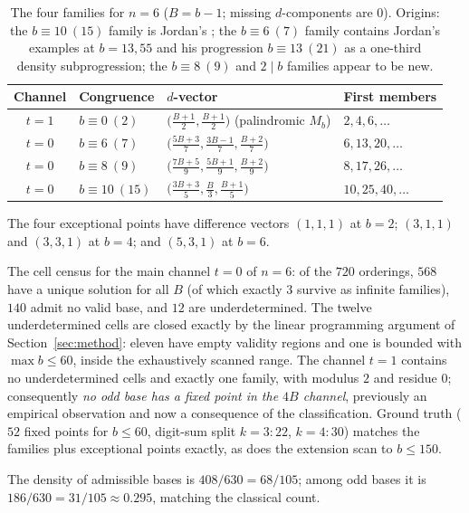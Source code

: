 \documentclass[11pt]{amsart}
\theoremstyle{definition}
\begin{document}
\begin{table}[ht]
\caption{The four families for $n=6$ ($B=b-1$; missing $d$-components
are $0$). Origins: the $b\equiv10\ (15)$ family is Jordan's
\cite{Jordan64}; the $b\equiv6\ (7)$ family contains Jordan's examples
at $b=13,55$ and his progression $b\equiv13\ (21)$ as a one-third
density subprogression; the $b\equiv8\ (9)$ and $2\mid b$ families
appear to be new.}\label{tab:n6}
\begin{tabular}{clll}
\toprule
Channel & Congruence & $d$-vector & First members \\
\midrule
$t=1$ & $b\equiv 0\ (2)$ & $\bigl(\tfrac{B+1}{2},\tfrac{B+1}{2}\bigr)$ (palindromic $M_b$) & $2,4,6,\dots$ \\
$t=0$ & $b\equiv 6\ (7)$ & $\bigl(\tfrac{5B+3}{7},\tfrac{3B-1}{7},\tfrac{B+2}{7}\bigr)$ & $6,13,20,\dots$ \\
$t=0$ & $b\equiv 8\ (9)$ & $\bigl(\tfrac{7B+5}{9},\tfrac{5B+1}{9},\tfrac{B+2}{9}\bigr)$ & $8,17,26,\dots$ \\
$t=0$ & $b\equiv 10\ (15)$ & $\bigl(\tfrac{3B+3}{5},\tfrac{B}{3},\tfrac{B+1}{5}\bigr)$ & $10,25,40,\dots$ \\
\bottomrule
\end{tabular}
\end{table}

The four exceptional points have difference vectors $(1,1,1)$ at
$b=2$; $(3,1,1)$ and $(3,3,1)$ at $b=4$; and $(5,3,1)$ at $b=6$.

The cell census for the main channel $t=0$ of $n=6$: of the $720$
orderings, $568$ have a unique solution for all $B$ (of which exactly
$3$ survive as infinite families), $140$ admit no valid base, and $12$
are underdetermined. The twelve underdetermined cells are closed
exactly by the linear programming argument of Section~\ref{sec:method}:
eleven have empty validity regions and one is bounded with
$\max b\le 60$, inside the exhaustively scanned range. The channel
$t=1$ contains no underdetermined cells and exactly one family, with
modulus $2$ and residue $0$; consequently \emph{no odd base has a
fixed point in the $4B$ channel}, previously an empirical
observation and now a consequence of the classification. Ground truth
($52$ fixed points for $b\le 60$, digit-sum split $k=3{:}22$,
$k=4{:}30$) matches the families plus exceptional points exactly, as
does the extension scan to $b\le 150$.

The density of admissible bases is $408/630=68/105$; among odd bases it
is $186/630=31/105\approx 0.295$, matching the classical count.
\end{document}
